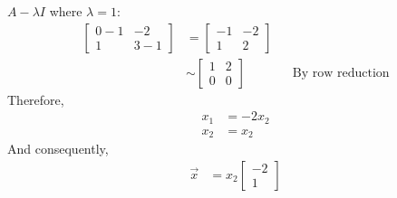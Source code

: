 \documentclass[10pt,letterpaper,final]{report}
\newcommand{\reason}[1]{&& \text{#1}}
\begin{document}
\begin{enumerate}[label=(\alph*)]
        $A - \lambda I$ where $\lambda = 1$:
        \begin{align*}
          \begin{bmatrix}
            0 - 1 & -2    \\
            1     & 3 - 1
          \end{bmatrix} & = \begin{bmatrix}
                              -1 & -2 \\
                              1  & 2
                            \end{bmatrix}                                \\[1ex]
                             & \sim \begin{bmatrix}
                                      1 & 2 \\
                                      0 & 0
                                    \end{bmatrix} \reason{By row reduction}
        \end{align*}
        Therefore,
        \begin{align*}
          x_1 & = -2x_2 \\
          x_2 & = x_2
        \end{align*}
        And consequently,
        \begin{align*}
          \vec{x} & = x_2\begin{bmatrix}
                           -2 \\
                           1
                         \end{bmatrix}
        \end{align*}


\end{enumerate}
\end{document}
